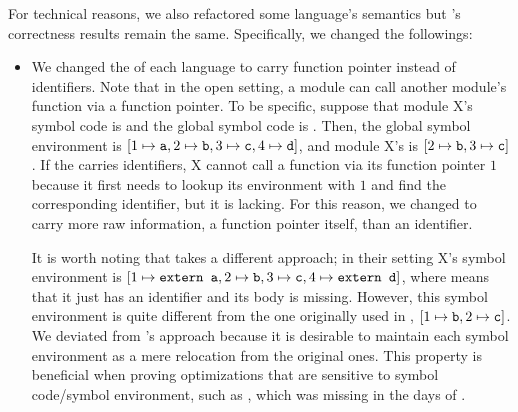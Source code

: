 For technical reasons, we also refactored some language's semantics but \cc{}'s correctness results remain the same.
Specifically, we changed the followings:
\begin{itemize}
\item We changed the  of each language to carry function pointer instead of identifiers.
  Note that in the open setting, a module can call another module's function via a function pointer.
  To be specific, suppose that module X's symbol code is \code{[b, c]} and the global symbol code is \code{[a, b, c, d]}.
  Then, the global symbol environment is $[1\mapsto\texttt{a}, 2\mapsto\texttt{b}, 3\mapsto\texttt{c}, 4\mapsto\texttt{d}]$,
  and module X's is $[2 \mapsto \texttt{b}, 3 \mapsto \texttt{c}]$.
  If the  carries identifiers, X cannot call a function  via its function pointer $1$ because it first needs to lookup its environment with $1$ and find the corresponding identifier, but it is lacking.
  For this reason, we changed  to carry more raw information, a function pointer itself, than an identifier.

  It is worth noting that \ccc{} takes a different approach; in their setting X's symbol environment is $[1\mapsto\texttt{extern a}, 2\mapsto\texttt{b}, 3\mapsto\texttt{c}, 4\mapsto\texttt{extern d}]$,
  where  means that it just has an identifier and its body is missing.
  However, this symbol environment is quite different from the one originally used in \cc{}, $[1\mapsto\texttt{b}, 2\mapsto\texttt{c}]$.
  We deviated from \ccc{}'s approach because it is desirable to maintain each symbol environment as a mere relocation from the original ones.
  This property is beneficial when proving optimizations that are sensitive to symbol code/symbol environment, such as , which was missing in the days of \ccc{}.



\end{itemize}
